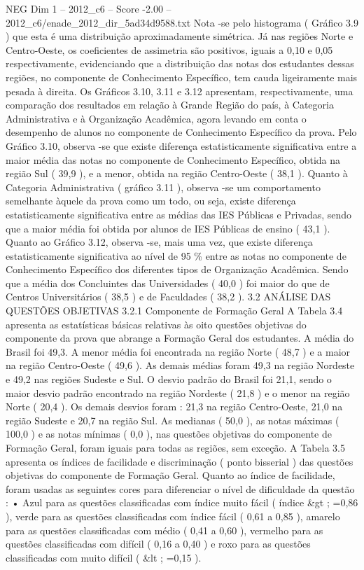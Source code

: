 \begin{textsample}{NEG Dim 1 – 2012\_c6 – Score -2.00 – 2012\_c6/enade\_2012\_dir\_5ad34d9588.txt}
Nota -se pelo histograma ( Gráfico 3.9 ) que esta é uma distribuição aproximadamente simétrica.
Já nas regiões Norte e Centro-Oeste, os coeficientes de assimetria são positivos, iguais a 0,10 e 0,05 respectivamente, evidenciando que a distribuição das notas dos estudantes dessas regiões, no componente de Conhecimento Específico, tem cauda ligeiramente mais pesada à direita.
Os Gráficos 3.10, 3.11 e 3.12 apresentam, respectivamente, uma comparação dos resultados em relação à Grande Região do país, à Categoria Administrativa e à Organização Acadêmica, agora levando em conta o desempenho de alunos no componente de Conhecimento Específico da prova.
Pelo Gráfico 3.10, observa -se que existe diferença estatisticamente significativa entre a maior média das notas no componente de Conhecimento Específico, obtida na região Sul ( 39,9 ), e a menor, obtida na região Centro-Oeste ( 38,1 ).
Quanto à Categoria Administrativa ( gráfico 3.11 ), observa -se um comportamento semelhante àquele da prova como um todo, ou seja, existe diferença estatisticamente significativa entre as médias das IES Públicas e Privadas, sendo que a maior média foi obtida por alunos de IES Públicas de ensino ( 43,1 ).
Quanto ao Gráfico 3.12, observa -se, mais uma vez, que existe diferença estatisticamente significativa ao nível de 95 \% entre as notas no componente de Conhecimento Específico dos diferentes tipos de Organização Acadêmica.
Sendo que a média dos Concluintes das Universidades ( 40,0 ) foi maior do que de Centros Universitários ( 38,5 ) e de Faculdades ( 38,2 ). 3.2 ANÁLISE DAS QUESTÕES OBJETIVAS 3.2.1 Componente de Formação Geral A Tabela 3.4 apresenta as estatísticas básicas relativas às oito questões objetivas do componente da prova que abrange a Formação Geral dos estudantes.
A média do Brasil foi 49,3.
A menor média foi encontrada na região Norte ( 48,7 ) e a maior na região Centro-Oeste ( 49,6 ).
As demais médias foram 49,3 na região Nordeste e 49,2 nas regiões Sudeste e Sul.
O desvio padrão do Brasil foi 21,1, sendo o maior desvio padrão encontrado na região Nordeste ( 21,8 ) e o menor na região Norte ( 20,4 ).
Os demais desvios foram : 21,3 na região Centro-Oeste, 21,0 na região Sudeste e 20,7 na região Sul.
As medianas ( 50,0 ), as notas máximas ( 100,0 ) e as notas mínimas ( 0,0 ), nas questões objetivas do componente de Formação Geral, foram iguais para todas as regiões, sem exceção.
A Tabela 3.5 apresenta os índices de facilidade e discriminação ( ponto bisserial ) das questões objetivas do componente de Formação Geral.
Quanto ao índice de facilidade, foram usadas as seguintes cores para diferenciar o nível de dificuldade da questão : • Azul para as questões classificadas com índice muito fácil ( índice \&gt ; =0,86 ), verde para as questões classificadas com índice fácil ( 0,61 a 0,85 ), amarelo para as questões classificadas com médio ( 0,41 a 0,60 ), vermelho para as questões classificadas com difícil ( 0,16 a 0,40 ) e roxo para as questões classificadas com muito difícil ( \&lt ; =0,15 ).

\end{textsample}
